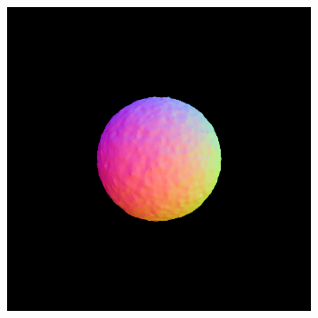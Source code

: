 \begin{figure}[ht]
    \centering
    \begin{subfigure}[b]{0.20\textwidth}
        \centering
        \fontsize{9pt}{7pt}\selectfont{}\vspace{3cm}
        \fontsize{9pt}{7pt}\selectfont{}\vspace{2.85cm}
        \fontsize{9pt}{7pt}\selectfont{}\vspace{1.95cm}
    \end{subfigure}
    \begin{subfigure}[b]{0.20\textwidth}
        \centering
        \includegraphics[width=\textwidth]{etc/a robot made out of plants/fantasia3d/fantasia_coarse_robot_0_part2.png}

\end{subfigure}
\end{figure}
